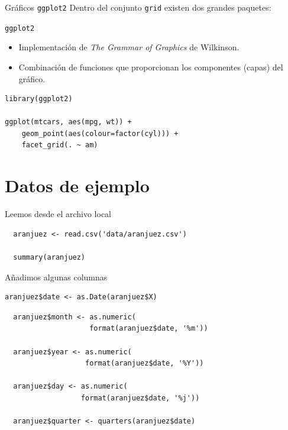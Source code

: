 \documentclass[xcolor={usenames,svgnames,dvipsnames}]{beamer}
\begin{document}
\begin{frame}[fragile,label={sec:orgheadline3}]{Gráficos \texttt{ggplot2}}
 Dentro del conjunto \texttt{grid} existen dos grandes paquetes:

\begin{block}{\texttt{ggplot2}}
\begin{itemize}
\item Implementación de \emph{The Grammar of Graphics} de Wilkinson.

\item Combinación de funciones que proporcionan los componentes (capas) del gráfico.
\end{itemize}

\lstset{language=R,label= ,caption= ,captionpos=b,numbers=none}
\begin{lstlisting}
library(ggplot2)

ggplot(mtcars, aes(mpg, wt)) +
    geom_point(aes(colour=factor(cyl))) +
    facet_grid(. ~ am)
\end{lstlisting}
\end{block}
\end{frame}

\section{Datos de ejemplo}
\label{sec:orgheadline7}
\begin{frame}[fragile,label={sec:orgheadline5}]{Leemos desde el archivo local}
 \lstset{language=R,label= ,caption= ,captionpos=b,numbers=none}
\begin{lstlisting}
  aranjuez <- read.csv('data/aranjuez.csv')

  summary(aranjuez)
\end{lstlisting}
\end{frame}

\begin{frame}[fragile,label={sec:orgheadline6}]{Añadimos algunas columnas}
 \lstset{language=R,label= ,caption= ,captionpos=b,numbers=none}
\begin{lstlisting}
aranjuez$date <- as.Date(aranjuez$X)
\end{lstlisting}
\lstset{language=R,label= ,caption= ,captionpos=b,numbers=none}
\begin{lstlisting}
  aranjuez$month <- as.numeric(
                    format(aranjuez$date, '%m'))

  aranjuez$year <- as.numeric(
                   format(aranjuez$date, '%Y'))

  aranjuez$day <- as.numeric(
                  format(aranjuez$date, '%j'))

  aranjuez$quarter <- quarters(aranjuez$date)
\end{lstlisting}
\end{frame}
\end{document}
